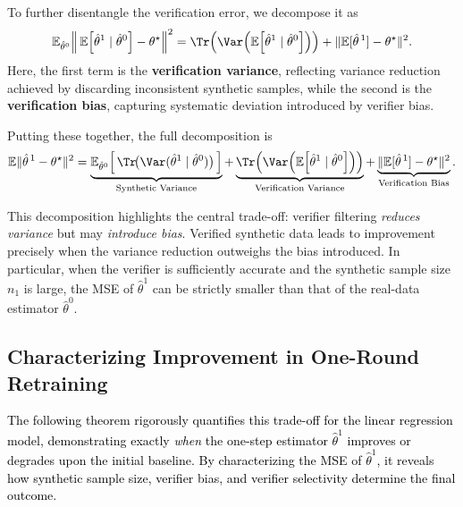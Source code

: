 To further disentangle the verification error, we decompose it as
\begin{equation}
    \mathbb{E}_{\hat{\theta}^0}\!\left\|\, 
        \mathbb{E}\!\left[\hat{\theta}^1 \mid \hat{\theta}^0\right] - \theta^\star 
    \right\|^2
    = \Tr\!\left( \Var\!\left( \mathbb{E}\!\left[\hat{\theta}^1 \mid \hat{\theta}^0\right] \right) \right)
    + \|\mathbb{E}[\hat{\theta}^{\,1}] - \theta^\star\|^2. 
    \label{equ:regression-risk-decomp2}
\end{equation}
Here, the first term is the \textbf{verification variance}, reflecting variance reduction achieved by discarding inconsistent synthetic samples, while the second is the \textbf{verification bias}, capturing systematic deviation introduced by verifier bias.

Putting these together, the full decomposition is
\begin{equation}\label{equ:regression-risk-decomp3}
    \mathbb{E}\|\hat{\theta}^{\,1}-\theta^\star\|^2
    = \underbrace{\mathbb{E}_{\hat{\theta}^0}\!\left[\, \Tr\!\big( \Var(\hat{\theta}^1 \mid \hat{\theta}^0) \big) \,\right]}_{\text{Synthetic Variance}} 
    + \underbrace{\Tr\!\left( \Var\!\left( \mathbb{E}\!\left[\hat{\theta}^1 \mid \hat{\theta}^0\right] \right) \right)}_{\text{Verification Variance}} 
    + \underbrace{\|\mathbb{E}[\hat{\theta}^{\,1}] - \theta^\star\|^2}_{\text{Verification Bias}}.
\end{equation}

This decomposition highlights the central trade-off: verifier filtering \emph{reduces variance} but may \emph{introduce bias}. Verified synthetic data leads to improvement precisely when the variance reduction outweighs the bias introduced. In particular, when the verifier is sufficiently accurate and the synthetic sample size $n_1$ is large, the MSE of $\hat{\theta}^1$ can be strictly smaller than that of the real-data estimator $\hat{\theta}^0$. 

\subsection{Characterizing Improvement in One-Round Retraining} 

\textcolor{black}{
The following theorem rigorously quantifies this trade-off for the linear regression model, demonstrating exactly \emph{when} the one-step estimator $\hat{\theta}^1$ improves or degrades upon the initial baseline.
By characterizing the MSE of $\hat{\theta}^1$, it reveals how synthetic sample size, verifier bias, and verifier selectivity determine the final outcome.
}

